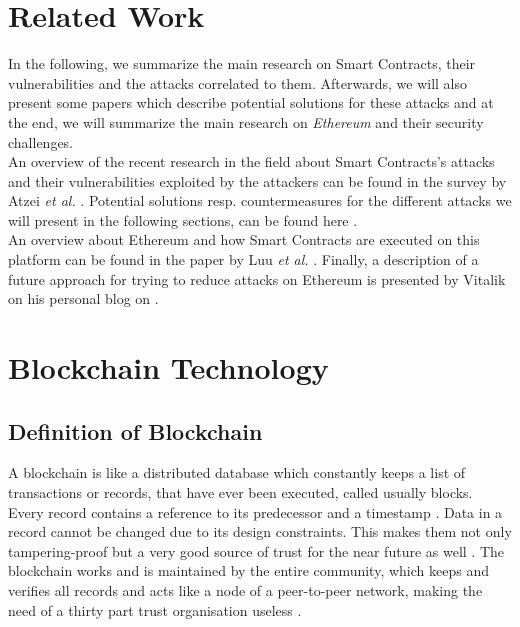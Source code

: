 \section{Related Work}
In the following, we summarize the main research on Smart Contracts, their  vulnerabilities and the attacks correlated to them. Afterwards, we will also present some papers which describe potential solutions for these attacks and at the end, we will summarize the main research on \textit{Ethereum} and their security challenges. \\
An overview of the recent research in the field about Smart Contracts's attacks and their vulnerabilities exploited by the attackers can be found in the survey by Atzei \textit{et al.} \cite{paper2}. Potential solutions resp. countermeasures for the different attacks we will present in the following sections, can be found here \cite{ paper2, ok, hardfork, timmedCommitments1, koetXD}. \\
An overview about Ethereum and how Smart Contracts are executed on this platform can be found in the paper by Luu \textit{et al.} \cite{paper1}. Finally, a description of a future approach for trying to reduce attacks on Ethereum is presented by Vitalik on his personal blog on \cite{challenge2, challenge3}. 



\section{Blockchain Technology}
\subsection{Definition of Blockchain}
A blockchain is like a distributed database which constantly keeps a list of transactions or records, that have ever been executed, called usually blocks. Every record contains a reference to its predecessor and a timestamp \cite{wikipedia1}.
Data in a record cannot be changed due to its design constraints. This makes them not only tampering-proof but a very good source of trust for the near future as well \cite{blockchain3}.
The blockchain works and is maintained by the entire community, which keeps and verifies all records and acts like a node of a peer-to-peer network, making the need of a thirty part trust organisation useless \cite{blockchain0}.
